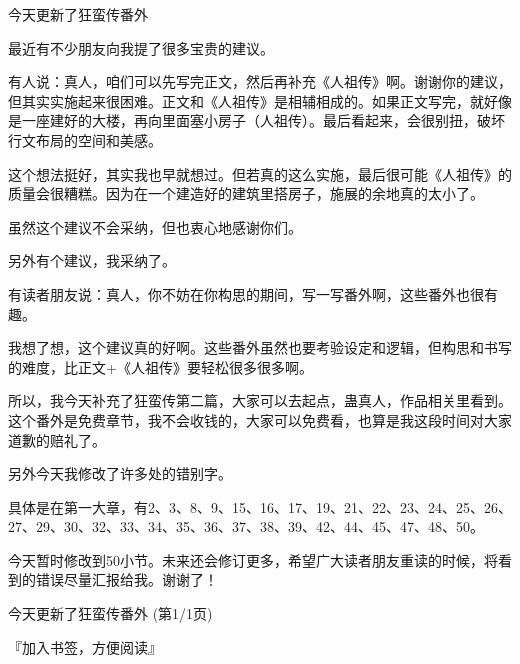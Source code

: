 \begin{this_body}
今天更新了狂蛮传番外

最近有不少朋友向我提了很多宝贵的建议。

有人说：真人，咱们可以先写完正文，然后再补充《人祖传》啊。谢谢你的建议，但其实实施起来很困难。正文和《人祖传》是相辅相成的。如果正文写完，就好像是一座建好的大楼，再向里面塞小房子（人祖传）。最后看起来，会很别扭，破坏行文布局的空间和美感。

这个想法挺好，其实我也早就想过。但若真的这么实施，最后很可能《人祖传》的质量会很糟糕。因为在一个建造好的建筑里搭房子，施展的余地真的太小了。

虽然这个建议不会采纳，但也衷心地感谢你们。

另外有个建议，我采纳了。

有读者朋友说：真人，你不妨在你构思的期间，写一写番外啊，这些番外也很有趣。

我想了想，这个建议真的好啊。这些番外虽然也要考验设定和逻辑，但构思和书写的难度，比正文+《人祖传》要轻松很多很多啊。

所以，我今天补充了狂蛮传第二篇，大家可以去起点，蛊真人，作品相关里看到。这个番外是免费章节，我不会收钱的，大家可以免费看，也算是我这段时间对大家道歉的赔礼了。

另外今天我修改了许多处的错别字。

具体是在第一大章，有2、3、8、9、15、16、17、19、21、22、23、24、25、26、27、29、30、32、33、34、35、36、37、38、39、42、44、45、47、48、50。

今天暂时修改到50小节。未来还会修订更多，希望广大读者朋友重读的时候，将看到的错误尽量汇报给我。谢谢了！

今天更新了狂蛮传番外 (第1/1页)

『加入书签，方便阅读』

\end{this_body}

